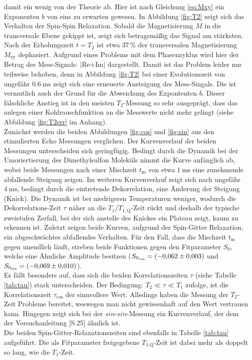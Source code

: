 damit ein wenig von der Theorie ab. Hier ist nach Gleichung \ref{eq:Mxy} ein Exponenten $b$ von
eins zu erwarten gewesen. In Abbildung \ref{fig:T2} zeigt sich das Verhalten der
Spin-Spin Relaxation. Sobald die Magnetisierung $M$ in die transversale Ebene gekippt
ist, zeigt sich betragsmäßig das Signal am stärksten. Nach der Erholungszeit
$t=T_2$ ist etwa $37\,\%$ der transversalen Magnetisierung $M_{\text{xy}}$
dephasiert. Aufgrund eines Problems mit dem Phasenzyklus wird hier der
Betrag des Mess-Signals: $|$Re$+$Im$|$ dargestellt. Damit ist das Problem leider
nur teilweise behoben, denn in Abbildung \ref{fig:T2} bei einer Evolutionszeit
von ungefähr $\SI{0,6}{\milli\second}$ zeigt sich eine erneuerte Ansteigung des
Mess-Singals. Die ist vermutlich auch der Grund für die Abweichung des Expontenten $b$.
Dieser fälschliche Anstieg ist in den meisten $T_2$-Messung so sehr ausgeprägt, dass
das anlegen einer Kohlrauschfunktion an die Messwerte nicht mehr gelingt (siehe Abbildung
\ref{fig:T2err} im Anhang).\\
Zunächst werden die beiden Abbildungen \ref{fig:cos} und \ref{fig:sin} aus den
stimulierten Echo Messungen verglichen. Der Kurvenverlauf der beiden Messungen
unterscheiden sich geringfügig. Bedingt durch die Dynamik bei der Umoriertierung
des Dimethylsulfon Moleküls nimmt die Kurve anfänglich ab, wobei beide Messungen
nach einer Mischzeit $t_{\text{m}}$ von etwa $\SI{1}{\milli\second}$ eine zunehmende
abfallende Steigung zeigen.
Im weiteren Kurvenverlauf zeigt sich nach ungefähr $\SI{4}{\milli\second}$,
bedingt durch die eintretende Dekorrelation, eine Änderung der Steigung (Knick).
Die Dynamik ist bei niedrigeren Temperaturen weniger, wodurch die Dekorrelations-Zeit
$\tau$ näher an die $T_1$/$T_{1,{\text{Q}}}$-Zeit rückt und deshalb der typische
zweistufen Zerfall, bei der sich anstelle des Knickes ein Plateau zeigt, kaum zu erkennen ist.
Zuletzt zeigen beide Kurven, aufgrund der Spin-Gitter Relaxation, ein
abgeschwächtes abfallendes Verhalten. Für den Fall, dass die
Mischzeit $t_{\text{m}}$ gegen unendlich läuft, streben beide Funktionen gegen den
Fitparameter $S_0$, welche eine Ähnliche Amplitude besitzen ($S_{0_{\text{cos}}} = \SI{-0.062\pm0.003}{}$ und
$S_{0_{\text{sin}}} = \SI{-0.069\pm0.01}{}$).\\
Es fällt besonders auf, dass sich die beiden Korrelationszeiten $\tau$ (siehe
Tabelle \ref{tab:tau}) stark unterscheiden. Der Bedingung: $T_2 \ll \tau \ll T_1$
zufolge, ist die Korrelationszeit $\tau_{\text{cos}}$ der sinnvollere Wert.
Alledings haben die Messung der $T_2$-Zeit Probleme bereitet, weswegen man
nicht gewissenhaft auf den Wert vertrauen kann. Hingegen zeigt sich bei der
$sin$-$sin$-Messung ein Kurvenverlauf, der dem der Versuchanleitung \cite{Anleitung}[S.25]
ähnlich ist.\\
Die beiden Spin-Gitter-Relaxationszeiten sind ebenfalls in Tabelle \ref{tab:tau}
aufgeführt. Die als Fitparameter freigegebene $T_{1\text{,Q}}$-Zeit ist dabei mehr
als doppelt so lang, wie die $T_1$-Zeit.

